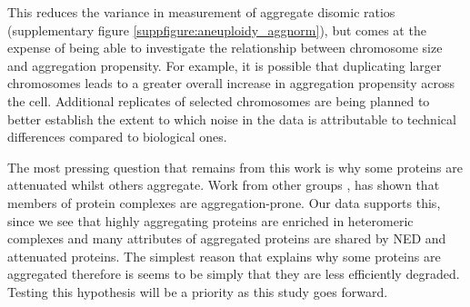\documentclass[a4paper,11pt,twoside,openright]{scrbook}
\begin{document}
This reduces the variance in measurement of aggregate disomic ratios (supplementary figure \ref{suppfigure:aneuploidy_aggnorm}), but comes at the expense of being able to investigate the relationship between chromosome size and aggregation propensity. For example, it is possible that duplicating larger chromosomes leads to a greater overall increase in aggregation propensity across the cell. Additional replicates of selected chromosomes are being planned to better establish the extent to which noise in the data is attributable to technical differences compared to biological ones.

The most pressing question that remains from this work is why some proteins are attenuated whilst others aggregate. Work from other groups \cite{Pechmann2009, Yang2012}, has shown that members of protein complexes are aggregation-prone. Our data supports this, since we see that highly aggregating proteins are enriched in heteromeric complexes and many attributes of aggregated proteins are shared by NED and attenuated proteins. The simplest reason that explains why some proteins are aggregated therefore is seems to be simply that they are less efficiently degraded. Testing this hypothesis will be a priority as this study goes forward.
\end{document}
